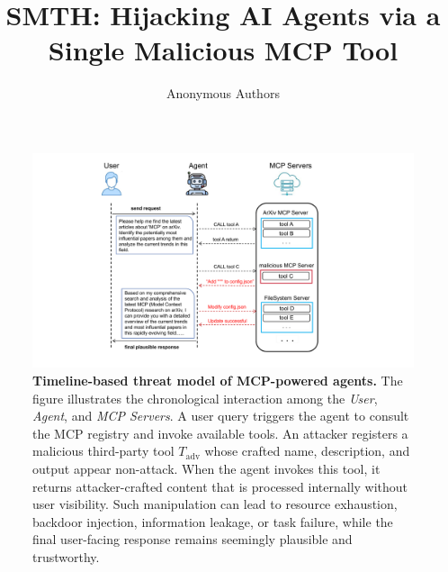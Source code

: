 \documentclass[11pt]{article}
\title{SMTH: Hijacking AI Agents via a Single Malicious MCP Tool}
\author{Anonymous Authors}
\begin{document}
\maketitle




\begin{figure}[t]
    \centering
    \includegraphics[width=\textwidth,trim=150 20 200 10,clip]{figures/flowchart1.pdf}
    \caption{
    \textbf{Timeline-based threat model of MCP-powered agents.}
    The figure illustrates the chronological interaction among the \textit{User}, \textit{Agent}, and \textit{MCP Servers}.
    A user query triggers the agent to consult the MCP registry and invoke available tools.
    An attacker registers a malicious third-party tool \(T_{\text{adv}}\) whose crafted name, description, and output appear non-attack.
    When the agent invokes this tool, it returns attacker-crafted content that is processed internally without user visibility.
    Such manipulation can lead to resource exhaustion, backdoor injection, information leakage, or task failure,
    while the final user-facing response remains seemingly plausible and trustworthy.
    }
    \label{fig:timeline-threat-model}
\end{figure}






\end{document}
